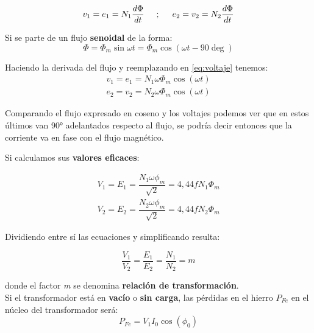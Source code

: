 \begin{equation}
	v_1 = e_1 = N_1 \dfrac{d\Phi}{dt} \hspace{.5cm};\hspace{.5cm} e_2 = v_2 = N_2 \dfrac{d\Phi}{dt}
	\label{eq:voltaje}
\end{equation}

Si se parte de un flujo \textbf{senoidal} de la forma:
\begin{equation}
	\Phi = \Phi_m \sin{\omega t} = \Phi_m \cos\left(\omega t - 90\deg\right)
\end{equation}

Haciendo la derivada del flujo y reemplazando en \ref{eq:voltaje} tenemos:
\begin{equation*}
	\begin{split}
		v_1 = e_1 = N_1 \omega \Phi_m \cos\left(\omega t\right) \\
		e_2 = v_2 = N_2 \omega \Phi_m \cos\left(\omega t\right)
	\end{split}
\end{equation*}

Comparando el flujo expresado en coseno y los voltajes podemos ver que en estos últimos van 90° adelantados respecto al flujo, se podría decir entonces que la corriente va en fase con el flujo magnético. 

Si calculamos sus \textbf{valores eficaces}:

\begin{equation}
	\begin{split}
		V_1 = E_1 = \dfrac{N_1 \omega \phi_m}{\sqrt{2}} = 4,44 f N_1 \Phi_m \\
		V_2 = E_2 = \dfrac{N_2 \omega \phi_m}{\sqrt{2}} = 4,44 f N_2 \Phi_m
	\end{split}
\end{equation}

Dividiendo entre sí las ecuaciones y simplificando resulta:

\begin{equation}
	\dfrac{V_1}{V_2} = \dfrac{E_1}{E_2} = \dfrac{N_1}{N_2} = m
\end{equation} 

donde el factor \textit{m} se denomina \textbf{relación de transformación}.\\

Si el transformador está en \textbf{vacío} o \textbf{sin carga}, las pérdidas en el hierro $P_{Fe}$ en el núcleo del transformador será:
\begin{equation}
	P_{Fe} = V_{1} I_{0} \cos \left(\phi_{0}\right)
\end{equation}

